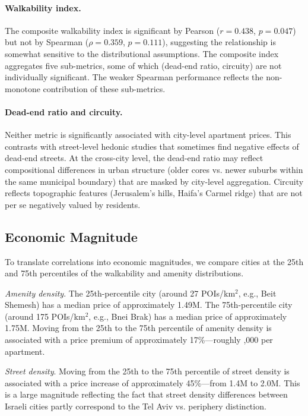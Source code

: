 \documentclass[12pt,a4paper]{article}
\begin{document}
\paragraph{Walkability index.}  The composite walkability index is significant
by Pearson ($r=0.438$, $p=0.047$) but not by Spearman ($\rho=0.359$,
$p=0.111$), suggesting the relationship is somewhat sensitive to the
distributional assumptions.  The composite index aggregates five sub-metrics,
some of which (dead-end ratio, circuity) are not individually significant.  The
weaker Spearman performance reflects the non-monotone contribution of these
sub-metrics.

\paragraph{Dead-end ratio and circuity.}  Neither metric is significantly
associated with city-level apartment prices.  This contrasts with street-level
hedonic studies that sometimes find negative effects of dead-end streets.  At
the cross-city level, the dead-end ratio may reflect compositional differences
in urban structure (older cores vs. newer suburbs within the same municipal
boundary) that are masked by city-level aggregation.  Circuity reflects
topographic features (Jerusalem's hills, Haifa's Carmel ridge) that are not
per se negatively valued by residents.

\subsection{Economic Magnitude}
\label{sec:results_magnitude}

To translate correlations into economic magnitudes, we compare cities at the
25th and 75th percentiles of the walkability and amenity distributions.

\textit{Amenity density}.  The 25th-percentile city (around 27 POIs/km$^2$,
e.g., Beit Shemesh) has a median price of approximately \textsterling 1.49M.
The 75th-percentile city (around 175 POIs/km$^2$, e.g., Bnei Brak) has a
median price of approximately \textsterling 1.75M.  Moving from the 25th to the
75th percentile of amenity density is associated with a price premium of
approximately 17\%—roughly ,000 per apartment.

\textit{Street density}.  Moving from the 25th to the 75th percentile of street
density is associated with a price increase of approximately 45\%—from
\textsterling 1.4M to \textsterling 2.0M.  This is a large magnitude reflecting
the fact that street density differences between Israeli cities partly correspond
to the Tel Aviv vs. periphery distinction.
\end{document}
